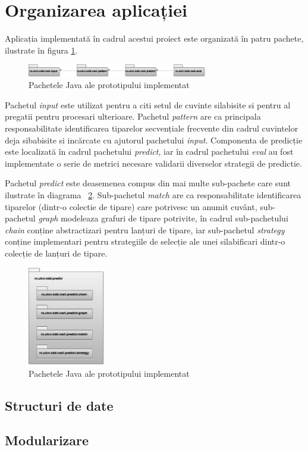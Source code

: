 \section{Organizarea aplicației}

Aplicația implementată în cadrul acestui proiect este organizată în patru pachete, ilustrate în figura \ref{fig:rosil-packages}.

\begin{figure}[h!]
    \centering
    \includegraphics[width=0.7\textwidth]{figures/rosil-packages.png}
    \caption{Pachetele Java ale prototipului implementat}
    \label{fig:rosil-packages}
\end{figure}

Pachetul \textit{input} este utilizat pentru a citi setul de cuvinte silabisite si pentru al pregatii pentru procesari ulterioare. Pachetul \textit{pattern} are ca principala responsabilitate identificarea tiparelor secvențiale frecvente din cadrul cuvintelor deja sibabisite si incărcate cu ajutorul pachetului \textit{input}. Componenta de predicție este localizată în cadrul pachetului \textit{predict}, iar în cadrul pachetului \textit{eval} au fost implementate o serie de metrici necesare validarii diverselor strategii de predictie.

Pachetul \textit{predict} este deasemenea compus din mai multe sub-pachete care sunt ilustrate în diagrama ~\ref{fig:rosil-predict-packages}. Sub-pachetul \textit{match} are ca responsabilitate identificarea tiparelor (dintr-o colectie de tipare) care potrivesc un anumit cuvânt, sub-pachetul \textit{graph} modeleaza grafuri de tipare potrivite, în cadrul sub-pachetului \textit{chain} conține abstractizari pentru lanțuri de tipare, iar sub-pachetul \textit{strategy} conține implementari pentru strategiile de selecție ale unei silabificari dintr-o colecție de lanțuri de tipare. 

\begin{figure}[h!]
    \centering
    \includegraphics[width=0.3\textwidth]{figures/rosil-predict-packages.png}
    \caption{Pachetele Java ale prototipului implementat}
    \label{fig:rosil-predict-packages}
\end{figure}
\subsection{Structuri de date}

\subsection{Modularizare}
